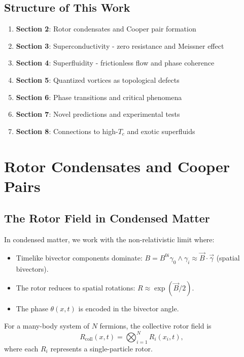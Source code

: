 \documentclass[12pt,a4paper]{article}
\theoremstyle{definition}
\theoremstyle{remark}
\begin{document}
\subsection{Structure of This Work}

\begin{enumerate}
\item \textbf{Section 2}: Rotor condensates and Cooper pair formation
\item \textbf{Section 3}: Superconductivity - zero resistance and Meissner effect
\item \textbf{Section 4}: Superfluidity - frictionless flow and phase coherence
\item \textbf{Section 5}: Quantized vortices as topological defects
\item \textbf{Section 6}: Phase transitions and critical phenomena
\item \textbf{Section 7}: Novel predictions and experimental tests
\item \textbf{Section 8}: Connections to high-$T_c$ and exotic superfluids
\end{enumerate}

\section{Rotor Condensates and Cooper Pairs}

\subsection{The Rotor Field in Condensed Matter}

In condensed matter, we work with the non-relativistic limit where:
\begin{itemize}
\item Timelike bivector components dominate: $B = B^{0i} \gamma_0 \wedge \gamma_i \approx \vec{B} \cdot \vec{\gamma}$ (spatial bivectors).
\item The rotor reduces to spatial rotations: $R \approx \exp(\vec{B}/2)$.
\item The phase $\theta(x,t)$ is encoded in the bivector angle.
\end{itemize}

For a many-body system of $N$ fermions, the collective rotor field is
\begin{equation}
R_{\text{coll}}(x,t) = \bigotimes_{i=1}^N R_i(x_i, t),
\end{equation}
where each $R_i$ represents a single-particle rotor.
\end{document}
